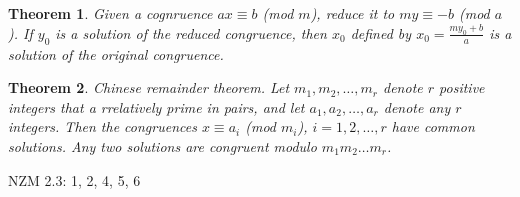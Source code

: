 \documentclass[11pt]{article} %
\newtheorem{theorem}{Theorem}[section]
\newenvironment{assignment}[1][Assignment]{\begin{trivlist}
\item[\hskip \labelsep {\bfseries #1}]}{\end{trivlist}}
\begin{document}
\begin{theorem}
	Given a cognruence $ax \equiv b$ (mod $m$), reduce it to $my \equiv - b$ (mod $a$). If $y_0$ is a solution of the reduced congruence, then $x_0$ defined by $x_0 = \frac{my_0 + b}{a}$ is a solution of the original congruence. 
\end{theorem}

\begin{theorem}
	Chinese remainder theorem. Let $m_1, m_2, \ldots, m_r$ denote $r$ positive integers that a rrelatively prime in pairs, and let $a_1, a_2, \ldots, a_r$ denote any $r$ integers. Then the congruences $x \equiv a_i$ (mod $m_i$), $i = 1, 2, \ldots, r$ have common solutions. Any two solutions are congruent modulo $m_1m_2\ldots m_r$. 
\end{theorem}

\begin{assignment}
	NZM 2.3: 1, 2, 4, 5, 6
\end{assignment}
\end{document}
